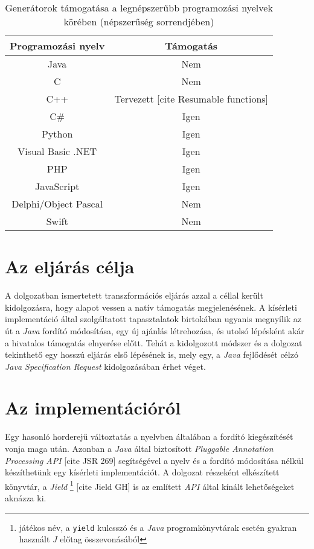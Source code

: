 \begin{table}
\captionsetup{justification=centering}
\centering
  \begin{tabular}{|| c | c ||}
  \hline
  Programozási nyelv & Támogatás \\
  \hline \hline
  Java                  & \cellcolor{red!20}Nem \\
  C                     & \cellcolor{red!20}Nem \\
  C++                   & \cellcolor{yellow!20}Tervezett [cite Resumable functions] \\
  C\#                   & \cellcolor{green!20}Igen \\
  Python                & \cellcolor{green!20}Igen \\
  Visual Basic .NET     & \cellcolor{green!20}Igen \\
  PHP                   & \cellcolor{green!20}Igen \\
  JavaScript            & \cellcolor{green!20}Igen \\
  Delphi/Object Pascal  & \cellcolor{red!20}Nem \\
  Swift                 & \cellcolor{red!20}Nem \\
  \hline
  \end{tabular}
\caption{Generátorok támogatása a legnépszerűbb programozási nyelvek körében (népszerűség sorrendjében)}  
\label{table:1}
\end{table}

\section{Az eljárás célja}

A dolgozatban ismertetett transzformációs eljárás azzal a céllal került kidolgozásra, hogy alapot vessen a natív támogatás megjelenésének. A kísérleti implementáció által szolgáltatott tapasztalatok birtokában ugyanis megnyílik az út a \textit{Java} fordító módosítása, egy új ajánlás létrehozása, és utolsó lépésként akár a hivatalos támogatás elnyerése előtt. 
Tehát a kidolgozott módszer és a dolgozat tekinthető egy hosszú eljárás első lépésének is, mely egy, a \textit{Java} fejlődését célzó \textit{Java Specification Request} kidolgozásában érhet véget. 

\section{Az implementációról}

Egy hasonló horderejű változtatás a nyelvben általában a fordító kiegészítését vonja maga után. Azonban a \textit{Java} által biztosított \textit{Pluggable Annotation Processing API} [cite JSR 269] segítségével a nyelv és a fordító módosítása nélkül készíthetünk egy kísérleti implementációt. A dolgozat részeként elkészített könyvtár, a \textit{Jield} \footnote{játékos név, a \texttt{yield} kulcsszó és a \textit{Java} programkönyvtárak esetén gyakran használt \textit{J} előtag összevonásából} [cite Jield GH] is az említett \textit{API} által kínált lehetőségeket aknázza ki.

